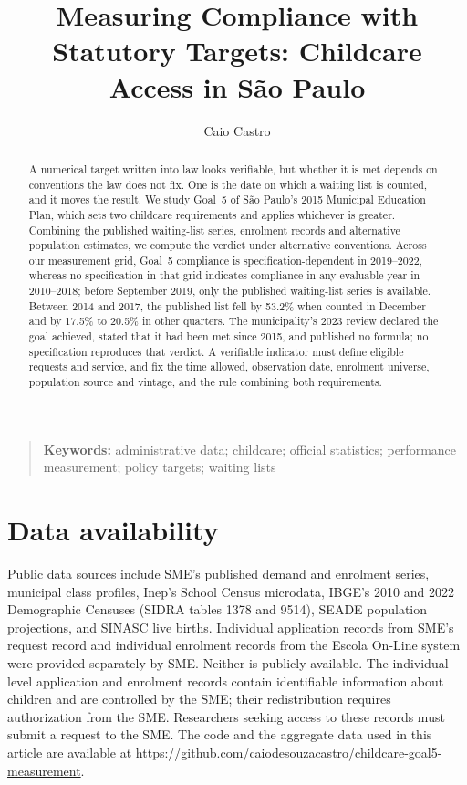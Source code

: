 \documentclass[12pt,a4paper]{article}
\title[Measuring compliance with statutory targets]{Measuring Compliance with Statutory Targets: Childcare Access in S\~ao Paulo}
\author[1,$\ast$]{Caio Castro\ORCID{0000-0002-6870-0578}}
\date{}
\newcommand{\keywords}[1]{\begin{quotation}\small\noindent\textbf{Keywords:} #1\end{quotation}}
\begin{document}
\maketitle

\begin{abstract}
A numerical target written into law looks verifiable, but whether it is met depends on conventions the law does not fix. One is the date on which a waiting list is counted, and it moves the result. We study Goal~5 of S\~ao Paulo's 2015 Municipal Education Plan, which sets two childcare requirements and applies whichever is greater. Combining the published waiting-list series, enrolment records and alternative population estimates, we compute the verdict under alternative conventions. Across our measurement grid, Goal~5 compliance is specification-dependent in 2019--2022, whereas no specification in that grid indicates compliance in any evaluable year in 2010--2018; before September 2019, only the published waiting-list series is available. Between 2014 and 2017, the published list fell by 53.2\% when counted in December and by 17.5\% to 20.5\% in other quarters. The municipality's 2023 review declared the goal achieved, stated that it had been met since 2015, and published no formula; no specification reproduces that verdict. A verifiable indicator must define eligible requests and service, and fix the time allowed, observation date, enrolment universe, population source and vintage, and the rule combining both requirements.
\end{abstract}
\keywords{administrative data; childcare; official statistics; performance measurement; policy targets; waiting lists}

\clearpage











\section*{Data availability}

Public data sources include SME's published demand and enrolment series, municipal class profiles, Inep's School Census microdata, IBGE's 2010 and 2022 Demographic Censuses (SIDRA tables 1378 and 9514), SEADE population projections, and SINASC live births. Individual application records from SME's request record and individual enrolment records from the Escola On-Line system were provided separately by SME. Neither is publicly available. The individual-level application and enrolment records contain identifiable information about children and are controlled by the SME; their redistribution requires authorization from the SME. Researchers seeking access to these records must submit a request to the SME. The code and the aggregate data used in this article are available at \url{https://github.com/caiodesouzacastro/childcare-goal5-measurement}.
\end{document}
